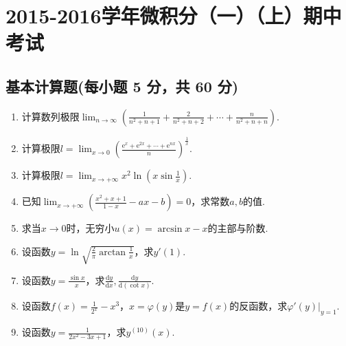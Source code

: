 \documentclass[../main.tex]{subfiles}
\begin{document}
\chapter{2015-2016学年微积分（一）（上）期中考试}

\section{基本计算题(每小题 5 分，共 60 分)}
\begin{enumerate}
    \item 计算数列极限$\lim_{n\to\infty}\left(\frac{1}{n^{2}+n+1}+\frac{2}{n^{2}+n+2}
              +\cdots+\frac{n}{n^{2}+n+n}\right)$.
          \vspace{7em}

    \item 计算极限$l=\lim_{x\to 0}\left(\frac{\mathrm{e}^{x}+\mathrm{e}^{2x}+\cdots+\mathrm{e}^{nx}}{n}
              \right)^{\frac{1}{x}}$.
          \vspace{7em}

    \item 计算极限$l=\lim_{x\to +\infty}x^{2}\ln\left(x\sin\frac{1}{x}\right)$.
          \vspace{7em}

    \item 已知$\lim_{x\to+\infty}\left(\frac{x^{2}+x+1}{1-x}-ax-b\right)=0$，求常数$a
              ,b$的值.
          \vspace{8em}

    \item 求当$x\to0$时，无穷小$u(x)=\arcsin x-x$的主部与阶数.
          \vspace{8em}

    \item 设函数$y=\ln\sqrt{\frac{2}{\pi}\arctan\frac{1}{x}}$，求$y'(1)$.
          \vspace{8em}

    \item 设函数$y=\frac{\sin x}{x}$，求$\frac{\mathrm{d}y}{\mathrm{d}x},\frac{\mathrm{d}y}{\mathrm{d}(\cot
                  x)}$.
          \vspace{7em}

    \item 设函数$f(x)=\frac{1}{2^{x}}-x^{3}$，$x=\varphi(y)$是$y=f(x)$的反函数，求$\left
              .\varphi'(y)\right|_{y=1}$.
          \vspace{7em}

    \item 设函数$y=\frac{1}{2x^{2}-3x+1}$，求$y^{(10)}(x)$.
          \vspace{8em}


\end{enumerate}
\end{document}
